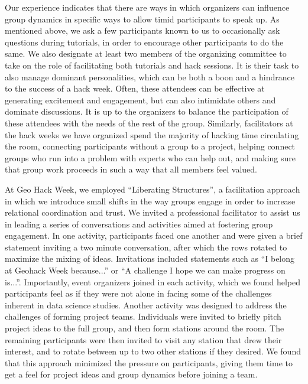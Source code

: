 \documentclass{aastex62}
\begin{document}
Our experience indicates that there are ways in which organizers can influence group dynamics in specific ways to allow timid participants to speak up. As mentioned above, we ask a few participants known to us to occasionally ask questions during tutorials, in order to encourage other participants to do the same. We also designate at least two members of the organizing committee to take on the role of facilitating both tutorials and hack sessions. It is their task to also manage dominant personalities, which can be both a boon and a hindrance to the success of a hack week. Often, these attendees can be effective at generating excitement and engagement, but can also intimidate others and dominate discussions. It is up to the organizers to balance the participation of these attendees with the needs of the rest of the group. Similarly, facilitators at the hack weeks we have organized spend the majority of hacking time circulating the room, connecting participants without a group to a project, helping connect groups who run into a problem with experts who can help out, and making sure that group work proceeds in such a way that all members feel valued.

At Geo Hack Week, we employed ``Liberating Structures'', a facilitation approach in which we introduce small shifts in the way groups engage in order to increase relational coordination and trust. We invited a professional facilitator to assist us in leading a series of conversations and activities aimed at fostering group engagement. In one activity, participants faced one another and were given a brief statement inviting a two minute conversation, after which the rows rotated to maximize the mixing of ideas. Invitations included statements such as ``I belong at Geohack Week because...'' or ``A challenge I hope we can make progress on is...''. Importantly, event organizers joined in each activity, which we found helped participants feel as if they were not alone in facing some of the challenges inherent in data science studies. Another activity was designed to address the challenges of forming project teams. Individuals were invited to briefly pitch project ideas to the full group, and then form stations around the room. The remaining participants were then invited to visit any station that drew their interest, and to rotate between up to two other stations if they desired. We found that this approach minimized the pressure on participants, giving them time to get a feel for project ideas and group dynamics before joining a team.
\end{document}
